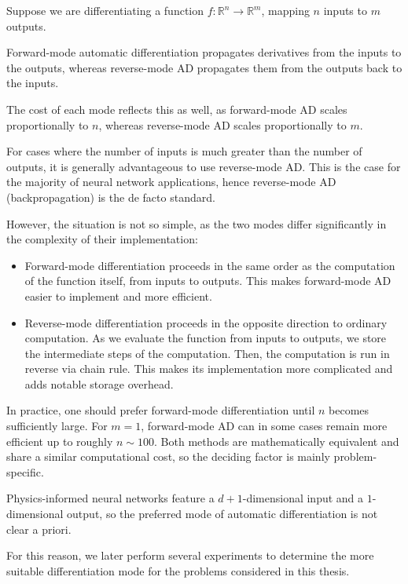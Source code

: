Suppose we are differentiating a function $f:\mathbb R^n \to \mathbb R^m$,
mapping $n$ inputs to $m$ outputs.

Forward-mode automatic differentiation propagates derivatives from the inputs to the outputs, whereas
reverse-mode AD propagates them from the outputs back to the inputs.

The cost of each mode reflects this as well,
as forward-mode AD scales proportionally to $n$, 
whereas
reverse-mode AD scales proportionally to $m$.

For cases where the number of inputs is much greater than the number of outputs, it is generally
advantageous to use reverse-mode AD. This is the case for the majority of neural network applications, hence
reverse-mode AD (backpropagation) is the de facto standard.

However, the situation is not so simple, as the two modes differ significantly in
the complexity of their implementation:

\begin{itemize}
\item Forward-mode differentiation proceeds in the same order as the computation of the function itself,
from inputs to outputs. This makes forward-mode AD easier to implement and more efficient.

\item Reverse-mode differentiation proceeds in the opposite direction to ordinary computation.
As we evaluate the function from inputs to outputs,
we store the intermediate steps of the computation.
Then, the computation is run in reverse via chain rule.
This makes its implementation more complicated and adds notable storage overhead.
\end{itemize}

In practice, one should prefer forward-mode differentiation until $n$ becomes sufficiently large.
For $m=1$, forward-mode AD can in some cases remain more efficient up to roughly $n\sim 100$.
Both methods are mathematically equivalent and
share a similar computational cost, so the deciding factor is mainly problem-specific.

Physics-informed neural networks feature a $d+1$-dimensional
input and a $1$-dimensional output, so the preferred mode of automatic differentiation is not clear a priori.

For this reason, we later perform several experiments to determine the more suitable differentiation mode for the problems considered in this thesis.

